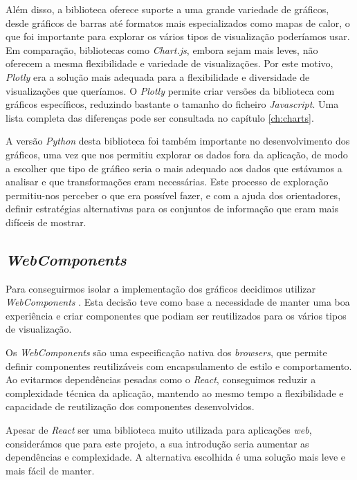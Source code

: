 Além disso, a biblioteca oferece suporte a uma grande variedade de gráficos, desde gráficos de barras até formatos mais especializados como mapas de calor, o que foi importante para explorar os vários tipos de visualização poderíamos usar. Em comparação, bibliotecas como \textit{Chart.js}, embora sejam mais leves, não oferecem a mesma flexibilidade e variedade de visualizações. Por este motivo, \textit{Plotly} era a solução mais adequada para a flexibilidade e diversidade de visualizações que queríamos. O \textit{Plotly} permite criar versões da biblioteca com gráficos específicos, reduzindo bastante o tamanho do ficheiro \textit{Javascript}. Uma lista completa das diferenças pode ser consultada no capítulo \ref{ch:charts}.

A versão \textit{Python} desta biblioteca foi também importante no desenvolvimento dos gráficos, uma vez que nos permitiu explorar os dados fora da aplicação, de modo a escolher que tipo de gráfico seria o mais adequado aos dados que estávamos a analisar e que transformações eram necessárias. Este processo de exploração permitiu-nos perceber o que era possível fazer, e com a ajuda dos orientadores, definir estratégias alternativas para os conjuntos de informação que eram mais difíceis de mostrar.

\subsection{\textit{WebComponents}}

Para conseguirmos isolar a implementação dos gráficos decidimos utilizar \textit{WebComponents} \cite{webcomponents}. Esta decisão teve como base a necessidade de manter uma boa experiência e criar componentes que podiam ser reutilizados para os vários tipos de visualização. 

Os \textit{WebComponents} \cite{webcomponents} são uma especificação nativa dos \textit{browsers}, que permite definir componentes reutilizáveis com encapsulamento de estilo e comportamento. Ao evitarmos dependências pesadas como o \textit{React}, conseguimos reduzir a complexidade técnica da aplicação, mantendo ao mesmo tempo a flexibilidade e capacidade de reutilização dos componentes desenvolvidos.

Apesar de \textit{React} ser uma biblioteca muito utilizada para aplicações \textit{web}, considerámos que para este projeto, a sua introdução seria aumentar as dependências e complexidade. A alternativa escolhida é uma solução mais leve e mais fácil de manter. 

